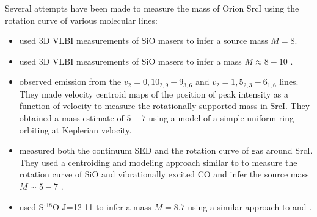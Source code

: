\documentclass[twocolumn]{aastex62}
\newcommand{\sourcei}{SrcI\xspace}
\begin{document}
Several attempts have been made to measure the mass of Orion \sourcei using the
rotation curve of various molecular lines:
\begin{itemize}
    \item \citet{Kim2008a} used 3D VLBI measurements of SiO masers  to infer a
        source mass $M=8$\msun.
    \item \citet{Matthews2010a} used 3D VLBI measurements of SiO masers %
        to infer a mass $M\approx8-10$ \msun.
    \item \citet{Hirota2014a} observed \water emission
        from the $v_2=0, 10_{2,9}-9_{3,6}$ and  $v_2=1, 5_{2,3}-6_{1,6}$ lines.
        They made
        velocity centroid maps of the position of peak intensity
        as a function of velocity to measure the rotationally supported
        mass in \sourcei.  They obtained a mass estimate of $5-7$ \msun
        using a model of a simple uniform
        ring orbiting at Keplerian velocity.
    \item \citet{Plambeck2016a} measured both the continuum SED and the rotation
        curve of gas around \sourcei.  They used a centroiding and modeling approach
        similar to \citet{Hirota2014a} to measure the rotation curve of SiO and
        vibrationally excited CO and infer the source mass $M\sim5-7$ \msun.
    \item \citet{Hirota2017b} used Si$^{18}$O J=12-11 to infer a mass $M=8.7$
        using a similar approach to \citet{Hirota2014a} and \citet{Plambeck2016a}.
\end{itemize}

\end{document}
